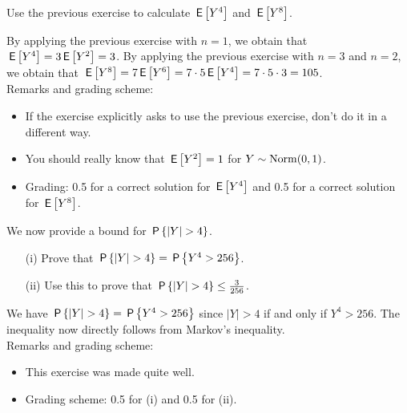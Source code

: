 \begin{exercise}[1]
Use the previous exercise to calculate $\E{Y^4}$ and $\E{Y^8}$. \\
\begin{solution}
By applying  the previous exercise with $n=1$, we obtain that 
$\E{Y^4} = 3\E{Y^2} = 3$. By applying  the previous exercise with $n=3$ and $n=2$, we obtain that  $\E{Y^8} = 7\E{Y^6} = 7 \cdot 5\E{Y^4} = 7 \cdot 5 \cdot 3  = 105$. \\

\noindent Remarks and grading scheme:
\begin{itemize}
\item If the exercise explicitly asks to use the previous exercise, don't do it in a different way. 
\item You should really know that $\E{Y^2} = 1$ for $Y \sim \Norm{0,1}$. 
\item Grading: 0.5 for a correct solution for  $\E{Y^4}$ and 0.5 for a correct solution for $\E{Y^8}$.
\end{itemize}
\end{solution}
\end{exercise}


\begin{exercise}[1]
We now provide a bound for $\P{|Y| > 4}$.
\begin{enumerate}
\item[(i)] Prove that  $\P{|Y| > 4} = \P{Y^4 > 256}$.
\item[(ii)] Use this to prove that $\P{|Y| > 4} \leq \frac3{256}$. 
\end{enumerate} 
\begin{solution}
We have $\P{|Y|> 4} = \P{Y^4 > 256}$ since $|Y| > 4$ if and only if $Y^4 > 256$. The inequality now directly follows from Markov's inequality. \\


\noindent Remarks and grading scheme:
\begin{itemize}
\item This exercise was made quite well.
\item Grading scheme: 0.5 for (i) and 0.5 for (ii).
\end{itemize}
\end{solution}
\end{exercise}


